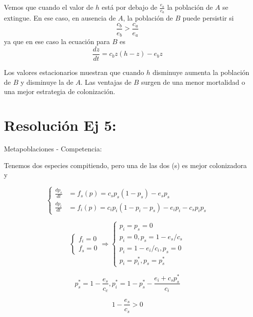 \documentclass[twocolumn,aps,prl]{revtex4-1}
\begin{document}
Vemos que cuando el valor de $h$ está por debajo de $\frac{e_{a}}{c_{a}}$ la población de $A$ se extingue. En ese caso, en ausencia de $A$, la población de $B$ puede persistir si
$$
\frac{c_{b}}{e_{b}}>\frac{c_{a}}{e_{a}}
$$
ya que en ese caso la ecuación para $B$ es
$$
\frac{d z}{d t} = c_{b} z \left( h - z \right) - e_{b} z
$$

Los valores estacionarios muestran que cuando $h$ disminuye aumenta la población de $B$ y disminuye la de $A$. Las ventajas de $B$ surgen de una menor mortalidad o una mejor estrategia de colonización.

% 
%                             
% 

\section{Resolución Ej 5:}

Metapoblaciones - Competencia:

Tenemos dos especies compitiendo, pero una de las dos (s) es mejor colonizadora y

$$
\left\{
\begin{aligned}
    \frac{d p_{s}}{d t} &=f_{s}(p)=c_{s} p_{s}\left(1-p_{s}\right)-e_{s} p_{s} \\ 
    \frac{d p_{i}}{d t} &=f_{i}(p)=c_{i} p_{i}\left(1-p_{i}-p_{s}\right)-e_{i} p_{i}-c_{s} p_{i} p_{s}
\end{aligned} 
\right.
$$

$$
\left\{
\begin{array} { l } 
    { f _ { i } = 0 } \\
    { f _ { s } = 0 }
\end{array} 
\right. 
\Rightarrow 
\left\{
\begin{array}{l}
    p_{i}=p_{s}=0 \\
    p_{i}=0, p_{s}=1-e_{s} / c_{s} \\
    p_{i}=1-e_{i} / c_{i}, p_{s}=0 \\
    p_{i}=p_{i}^{*}, p_{s}=p_{s}^{*}
\end{array}
\right.
$$



$$
p_{s}^{*}=1-\frac{e_{s}}{c_{c}}, p_{i}^{*}=1-p_{s}^{*}-\frac{e_{i}+c_{s} p_{s}^{*}}{c_{i}}
$$

$$
1 - \frac{e_{s}}{c_{s}} > 0
$$
\end{document}
